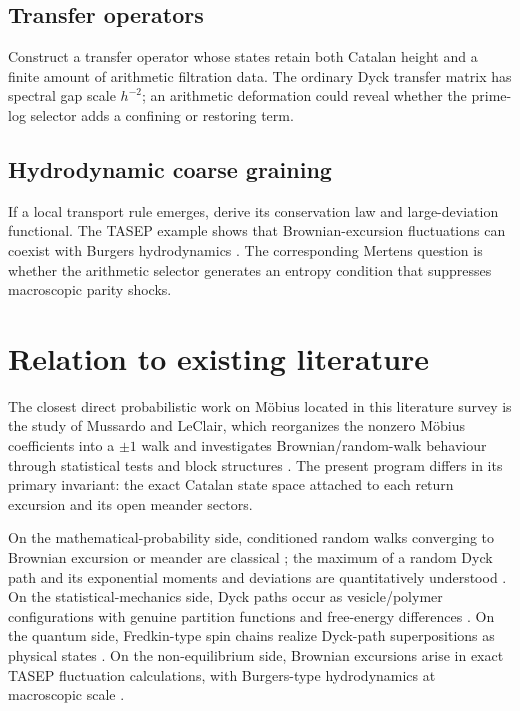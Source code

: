 \documentclass[11pt]{amsart}
\numberwithin{equation}{section}
\theoremstyle{plain}
\theoremstyle{definition}
\theoremstyle{remark}
\begin{document}
\subsection{Transfer operators}
\label{subsec:program_transfer}

Construct a transfer operator whose states retain both Catalan height and a finite amount of arithmetic filtration data.  The ordinary Dyck transfer matrix has spectral gap scale $h^{-2}$; an arithmetic deformation could reveal whether the prime-log selector adds a confining or restoring term.

\subsection{Hydrodynamic coarse graining}
\label{subsec:program_hydrodynamic}

If a local transport rule emerges, derive its conservation law and large-deviation functional.  The TASEP example shows that Brownian-excursion fluctuations can coexist with Burgers hydrodynamics \cite{DerridaEnaudLebowitz2004}.  The corresponding Mertens question is whether the arithmetic selector generates an entropy condition that suppresses macroscopic parity shocks.

\section{Relation to existing literature}
\label{sec:literature_position}

The closest direct probabilistic work on M\"obius located in this literature survey is the study of Mussardo and LeClair, which reorganizes the nonzero M\"obius coefficients into a $\pm1$ walk and investigates Brownian/random-walk behaviour through statistical tests and block structures \cite{MussardoLeClair2021}.  The present program differs in its primary invariant: the exact Catalan state space attached to each return excursion and its open meander sectors.

On the mathematical-probability side, conditioned random walks converging to Brownian excursion or meander are classical \cite{Kaigh1976,DurrettIglehartMiller1977,CsakiMohanty1981}; the maximum of a random Dyck path and its exponential moments and deviations are quantitatively understood \cite{KhorunzhiyMarckert2009,Kousha2012}.  On the statistical-mechanics side, Dyck paths occur as vesicle/polymer configurations with genuine partition functions and free-energy differences \cite{OwczarekPrellberg2014,HaugPrellberg2015}.  On the quantum side, Fredkin-type spin chains realize Dyck-path superpositions as physical states \cite{DellAnnaEtAl2016,SalbergerKorepin2017}.  On the non-equilibrium side, Brownian excursions arise in exact TASEP fluctuation calculations, with Burgers-type hydrodynamics at macroscopic scale \cite{DerridaEnaudLebowitz2004}.
\end{document}
